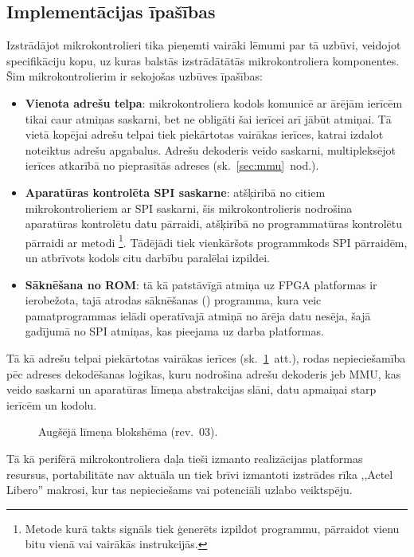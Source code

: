 \subsection{Implementācijas īpašības} \label{sec:design}
Izstrādājot mikrokontrolieri tika pieņemti vairāki lēmumi par tā uzbūvi,
veidojot specifikāciju kopu, uz kuras
balstās izstrādātātās mikrokontroliera komponentes.
Šim mikrokontrolierim ir sekojošas uzbūves īpašības:
\begin{itemize}
	\item \textbf{Vienota adrešu telpa}:
		mikrokontroliera kodols komunicē ar ārējām ierīcēm tikai caur
		atmiņas saskarni, bet ne obligāti šai ierīcei arī jābūt atmiņai.
		Tā vietā kopējai adrešu telpai tiek piekārtotas vairākas ierīces,
		katrai izdalot noteiktus adrešu apgabalus. Adrešu dekoderis veido saskarni,
		multipleksējot ierīces atkarībā no pieprasītās adreses
		(sk.~\ref{sec:mmu}~nod.).\pagebreak[1]
	\item \textbf{Aparatūras kontrolēta SPI saskarne}:
		atšķirībā no citiem mikrokontrolieriem ar SPI saskarni,
		šis mikro\-kontrolieris nodrošina aparatūras kontrolētu datu pārraidi,
		atšķirībā no programmatūras kontrolētu pārraidi ar
		 metodi%
		\footnote{Metode kurā takts signāls tiek ģenerēts izpildot programmu,
			pārraidot vienu bitu vienā vai vairākās instrukcijās.}.
		Tādējādi tiek vienkāršots programmkods SPI pārraidēm, un atbrīvots
		kodols citu darbību paralēlai izpildei.
	\item \textbf{Sāknēšana no ROM}:
		tā kā patstāvīgā atmiņa uz FPGA platformas ir ierobežota, tajā
		atrodas sāknēšanas () programma,
		kura veic pamatprogrammas ielādi
		operatīvajā atmiņā no ārēja datu nesēja, šajā gadījumā no 
		SPI  atmiņas, kas pieejama uz darba platformas.
\end{itemize}

Tā kā adrešu telpai piekārtotas vairākas ierīces (sk.~\ref{fig:top-rev3}~att.),
rodas nepieciešamība pēc adreses dekodēšanas loģikas, kuru nodrošina
adrešu dekoderis jeb MMU, kas veido saskarni un 
aparatūras līmeņa abstrakcijas slāni, datu apmaiņai starp ierīcēm un kodolu.

\begin{figure}[tbhp]
	\centering
	\def\svgwidth{\textwidth}
	{}
	\caption{Augšējā līmeņa blokshēma (rev.~03).}
	\label{fig:top-rev3}
\end{figure}

Tā kā perifērā mikrokontroliera daļa tieši izmanto realizācijas
platformas resursus, portabilitāte nav aktuāla un tiek brīvi izmantoti izstrādes rīka 
,,Actel Libero'' makrosi, kur tas nepieciešams vai potenciāli uzlabo
veiktspēju.
\FloatBarrier %
